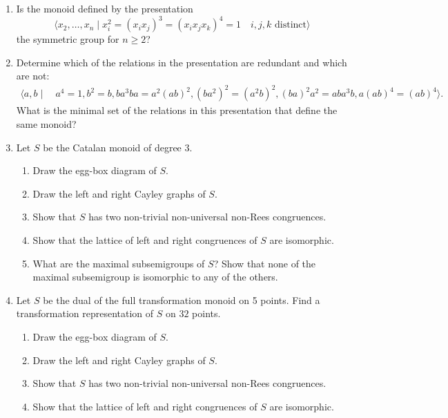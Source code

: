 \documentclass{article}
\begin{document}
\begin{enumerate}
  \item
    Is the monoid defined by the presentation
    \[
      \langle x_2, \ldots, x_n\mid x_i^2 = (x_ix_j) ^3 =
      (x_ix_jx_k)^4 = 1\quad i, j, k \text{ distinct}\rangle
    \]
    the symmetric group for $n\geq 2$?

  \item
    Determine which of the relations in the presentation are redundant and
    which are not:
    \begin{align*}
      \langle a, b \mid &\
      a^4=1,  b^2= b,
      ba^3ba= a^2(ab)^2,  (ba^2)^2= (a^2b)^2 ,  (ba)^2a^2= aba^3b,
      a(ab)^4= (ab)^4
      \rangle.
    \end{align*}
    What is the minimal set of the relations in this presentation that
    define the same monoid?

  \item
    Let $S$ be the Catalan monoid of degree $3$.
    \begin{enumerate}
      \item
        Draw the egg-box diagram of $S$.
      \item
        Draw the left and right Cayley graphs of $S$.
      \item
        Show that $S$ has two non-trivial non-universal non-Rees congruences.
      \item
        Show that the lattice of left and right congruences of $S$
        are isomorphic.
      \item
        What are the maximal subsemigroups of $S$? Show that none of
        the maximal subsemigroup is isomorphic to any of the others.
    \end{enumerate}

  \item
    Let $S$ be the dual of the full transformation monoid on 5
    points. Find a transformation representation of $S$ on $32$ points.
    \begin{enumerate}
      \item
        Draw the egg-box diagram of $S$.
      \item
        Draw the left and right Cayley graphs of $S$.
      \item
        Show that $S$ has two non-trivial non-universal non-Rees congruences.
      \item
        Show that the lattice of left and right congruences of $S$
        are isomorphic.
    \end{enumerate}


\end{enumerate}
\end{document}
